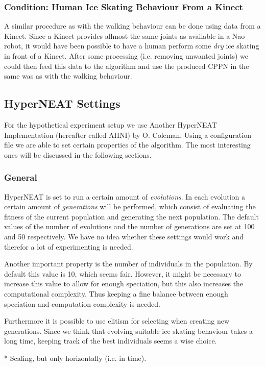 \documentclass[a4paper,10pt]{article}
\begin{document}
\subsubsection{Condition: Human Ice Skating Behaviour From a Kinect}
A similar procedure as with the walking behaviour can be done using data from a Kinect. Since a Kinect provides allmost the same joints as available in a Nao robot, it would have been possible to have a human perform some \emph{dry} ice skating in front of a Kinect. After some processing (i.e. removing unwanted joints) we could then feed this data to the algorithm and use the produced CPPN in the same was as with the walking behaviour.

\subsection{HyperNEAT Settings}
For the hypothetical experiment setup we use Another HyperNEAT Implementation (hereafter called AHNI) by O. Coleman. Using a configuration file we are able to set certain properties of the algorithm. The most interesting ones will be discussed in the following sections.

\subsubsection{General}
HyperNEAT is set to run a certain amount of \emph{evolutions}. In each evolution a certain amount of \emph{generations} will be performed, which consist of evaluating the fitness of the current population and generating the next population. The default values of the number of evolutions and the number of generations are set at 100 and 50 respectively. We have no idea whether these settings would work and therefor a lot of experimenting is needed.

Another important property is the number of individuals in the population. By default this value is 10, which seems fair. However, it might be necessary to increase this value to allow for enough speciation, but this also increases the computational complexity. Thus keeping a fine balance between enough speciation and computation complexity is needed.

Furthermore it is possible to use elitism for selecting when creating new generations. Since we think that evolving suitable ice skating behaviour takes a long time, keeping track of the best individuals seems a wise choice.


* Scaling, but only horizontally (i.e. in time).
\end{document}
